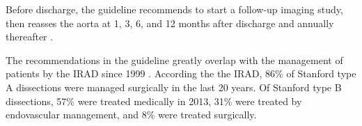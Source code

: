 \documentclass[thesis.tex]{subfiles}
\begin{document}
Before discharge, the guideline recommends to start a follow-up imaging study, then reasses the aorta at 1, 3, 6, and 12 months after discharge and annually thereafter \cite{hiratzka20102010}.

The recommendations in the guideline greatly overlap with the management of patients by the IRAD since 1999 \cite{doi:10.1161/CIRCULATIONAHA.117.031264}. According the the IRAD, 86\% of Stanford type A dissections were managed surgically in the last 20 years. Of Stanford type B dissections, 57\% were treated medically in 2013, 31\% were treated by endovascular management, and 8\% were treated surgically.  



\subfilebib %
\end{document}
